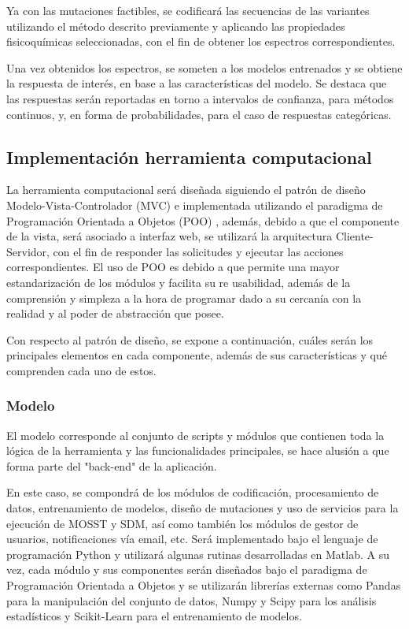 Ya con las mutaciones factibles, se codificará las secuencias de las variantes utilizando el método descrito previamente y aplicando las propiedades fisicoquímicas seleccionadas, con el fin de obtener los espectros correspondientes. 

Una vez obtenidos los espectros, se someten a los modelos entrenados y se obtiene la respuesta de interés, en base a las características del modelo. Se destaca que las respuestas serán reportadas en torno a intervalos de confianza, para métodos continuos, y, en forma de probabilidades, para el caso de respuestas categóricas.
 
\subsection{Implementación herramienta computacional}

La herramienta computacional será diseñada siguiendo el patrón de diseño Modelo-Vista-Controlador (MVC) \cite{krasner1988description} e implementada utilizando el paradigma de Programación Orientada a Objetos (POO) \cite{wegner1990concepts}, además, debido a que el componente de la vista, será asociado a interfaz web, se utilizará la arquitectura Cliente-Servidor, con el fin de responder las solicitudes y ejecutar las acciones correspondientes. El uso de POO es debido a que permite una mayor estandarización de los módulos y facilita su re usabilidad, además de la comprensión y simpleza a la hora de programar dado a su cercanía con la realidad y al poder de abstracción que posee.

Con respecto al patrón de diseño, se  expone  a continuación, cuáles serán los principales elementos en cada componente, además de sus características y qué comprenden cada uno de estos.

\subsubsection{Modelo}

El modelo corresponde al conjunto de scripts y módulos que contienen toda la lógica de la herramienta y las funcionalidades principales, se hace alusión a que forma parte del "back-end" de la aplicación. 

En este caso, se compondrá de los módulos de codificación, procesamiento de datos, entrenamiento de modelos, diseño de mutaciones y uso de servicios para la ejecución de MOSST y SDM, así como también los módulos de gestor de usuarios, notificaciones vía email, etc. Será implementado bajo el lenguaje de programación Python y utilizará algunas rutinas desarrolladas en Matlab. A su vez, cada módulo y sus componentes serán diseñados bajo el paradigma de Programación Orientada a Objetos y se utilizarán librerías externas como Pandas \cite{mckinney2010data} para la manipulación del conjunto de datos, Numpy \cite{van2011numpy} y Scipy \cite{oliphant2007python} para los análisis estadísticos y Scikit-Learn \cite{pedregosa2011scikit} para el entrenamiento de modelos.

